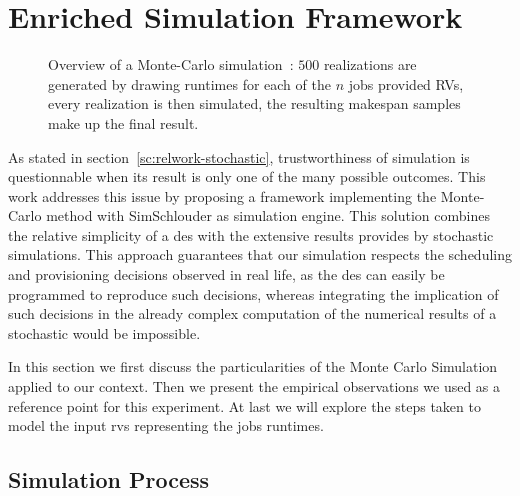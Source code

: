 \documentclass[10pt,conference,compsocconf]{IEEEtran}
\begin{document}
\section{Enriched Simulation Framework}\label{sec:enriched-sim}

\begin{figure}
	\centering
	\resizebox{0.5\textwidth}{!}{%
		
		}
\caption{Overview of a Monte-Carlo simulation~: $500$ realizations are generated
by drawing runtimes for each of the $n$ jobs provided RVs, every realization is
then simulated, the resulting makespan samples make up the final result.}\label{fig:mc-process}
\end{figure}



As stated in  section~\ref{sc:relwork-stochastic}, trustworthiness of simulation
is questionnable when its result is only one of the many possible outcomes. This
work addresses this issue by  proposing a framework implementing the Monte-Carlo
method  with SimSchlouder  as  simulation engine.   This  solution combines  the
relative  simplicity  of a  \ac{des}  with  the  extensive results  provides  by
stochastic simulations.   This approach guarantees that  our simulation respects
the scheduling and provisioning decisions observed in real life, as the \ac{des}
can easily  be programmed to  reproduce such decisions, whereas  integrating the
implication  of  such  decisions  in  the already  complex  computation  of  the
numerical results of a stochastic would be impossible.

In  this  section we  first  discuss  the  particularities  of the  Monte  Carlo
Simulation applied to our context. Then we present the empirical observations we
used as a reference point for this experiment. At last we will explore the steps
taken to model the input \acp{rv} representing the jobs runtimes.

\subsection{Simulation Process}

\end{document}
